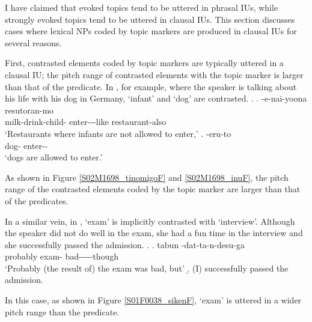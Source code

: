 I have claimed that
evoked topics tend to be uttered in phrasal IUs,
while strongly evoked topics tend to be uttered in clausal IUs.
This section discusses cases where
lexical NPs coded by topic markers are produced in clausal IUs
for several reasons.

First, contrasted elements coded by topic markers are typically uttered in a clausal IU;
the pitch range of contrasted elements with the topic marker  is larger than
that of the predicate.
In \Next, for example,
where the speaker is talking about his life with his dog in Germany,
 `infant' and  `dog' are contrasted.
%
\ex.\label{S02M1698_tinomigo}
 \ag.  -e-nai-yoona resutoran-mo \tp{\dvline} \\
 		milk-drink-child- enter---like restaurant-also {} \\
		`Restaurants where infants are not allowed to enter,'
 \bg.  -eru-to \tp{\dvline} \\
 		dog- enter-- {}\\
 		`dogs are allowed to enter.'

As shown in Figure \ref{S02M1698_tinomigoF} and \ref{S02M1698_inuF},
the pitch range of the contrasted elements coded by the topic marker  are larger than that of the predicates.

In a similar vein,
in \Next,
 `exam' is implicitly contrasted with  `interview'.
Although the speaker did not do well in the exam,
she had a fun time in the interview and she successfully passed the admission.
\ex.\label{S01F0038_siken}
 \ag. tabun  -dat-ta-n-desu-ga \tp{\dvline} \\
 	probably exam- bad-----though {} \\
	`Probably (the result of) the exam was bad, but'
 \b. (I) successfully passed the admission.

In this case,
as shown in Figure \ref{S01F0038_sikenF},
 `exam' is uttered in a wider pitch range than the predicate.

